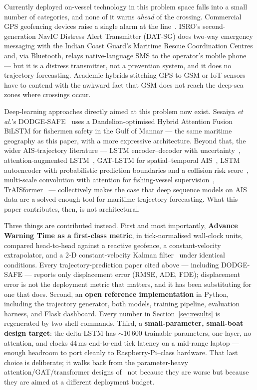 \documentclass[conference]{IEEEtran}
\begin{document}
Currently deployed on-vessel technology in this problem space falls into a small number of categories, and none of it warns \emph{ahead} of the crossing. Commercial GPS geofencing devices raise a single alarm at the line~\cite{ranjith2014,garmin}. ISRO's second-generation NavIC Distress Alert Transmitter (DAT-SG) does two-way emergency messaging with the Indian Coast Guard's Maritime Rescue Coordination Centres and, via Bluetooth, relays native-language SMS to the operator's mobile phone~\cite{sacdatsg,dwivedi_navic} --- but it is a distress transmitter, not a prevention system, and it does no trajectory forecasting. Academic hybrids stitching GPS to GSM or IoT sensors~\cite{ranjith2014,sastry2020,prakash2021} have to contend with the awkward fact that GSM does not reach the deep-sea zones where crossings occur.

Deep-learning approaches directly aimed at this problem now exist. Sesaiya \emph{et al.}'s DODGE-SAFE~\cite{dodgesafe2025} uses a Dandelion-optimised Hybrid Attention Fusion BiLSTM for fishermen safety in the Gulf of Mannar --- the same maritime geography as this paper, with a more expressive architecture. Beyond that, the wider AIS-trajectory literature --- LSTM encoder--decoder with uncertainty~\cite{capobianco_fusion2021}, attention-augmented LSTM~\cite{zhang2020}, GAT-LSTM for spatial--temporal AIS~\cite{gatlstm2023}, LSTM autoencoder with probabilistic prediction boundaries and a collision risk score~\cite{rocholl2025}, multi-scale convolution with attention for fishing-vessel supervision~\cite{lmca2025}, TrAISformer~\cite{nguyen2024} --- collectively makes the case that deep sequence models on AIS data are a solved-enough tool for maritime trajectory forecasting. What this paper contributes, then, is not architectural.

Three things are contributed instead. First and most importantly, \textbf{Advance Warning Time as a first-class metric}, in tick-normalised wall-clock units, compared head-to-head against a reactive geofence, a constant-velocity extrapolator, and a 2-D constant-velocity Kalman filter~\cite{kalman1960} under identical conditions. Every trajectory-prediction paper cited above --- including DODGE-SAFE --- reports only displacement error (RMSE, ADE, FDE); displacement error is not the deployment metric that matters, and it has been substituting for one that does. Second, an \textbf{open reference implementation} in Python, including the trajectory generator, both models, training pipeline, evaluation harness, and Flask dashboard. Every number in Section~\ref{sec:results} is regenerated by two shell commands. Third, a \textbf{small-parameter, small-boat design target}: the delta-LSTM has $\sim$10\,600 trainable parameters, one layer, no attention, and clocks 44\,ms end-to-end tick latency on a mid-range laptop --- enough headroom to port cleanly to Raspberry-Pi--class hardware. That last choice is deliberate; it walks back from the parameter-heavy attention/GAT/transformer designs of~\cite{dodgesafe2025,zhang2020,gatlstm2023,nguyen2024} not because they are worse but because they are aimed at a different deployment budget.
\end{document}
